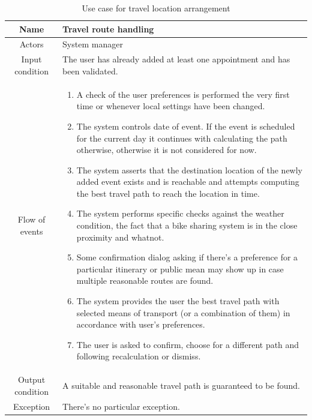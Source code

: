 \begin{table}
\centering
	\begin{tabular}{|c||p{}|}
		\hline
		Name & Travel route handling \\ \hline
		Actors & System manager \\ \hline
		Input condition & The user has already added at least one appointment and has been validated. \\ \hline
		Flow of events & \begin{enumerate}
			\item A check of the user preferences is performed the very first time or whenever local settings have been changed.
            \item The system controls date of event. If the event is scheduled for the current day it continues with calculating the path otherwise, otherwise it is not considered for now.
            \item The system asserts that the destination location of the newly added event exists and is reachable and attempts computing the best travel path to reach the location in time.
			\item The system performs specific checks against the weather condition, the fact that a bike sharing system is in the close proximity and whatnot.
            \item Some confirmation dialog asking if there's a preference for a particular itinerary or public mean may show up in case multiple reasonable routes are found.
            \item The system provides the user the best travel path with selected means of transport (or a combination of them) in accordance with user's preferences.
            \item The user is asked to confirm, choose for a different path and following recalculation or dismiss.
		\end{enumerate} \\ \hline
		Output condition & A suitable and reasonable travel path is guaranteed to be found. \\ \hline
		Exception & There's no particular exception.  \\ \hline		
	\end{tabular}
\caption{Use case for travel location arrangement}
\label{usecase_travel_location}
\end{table}

